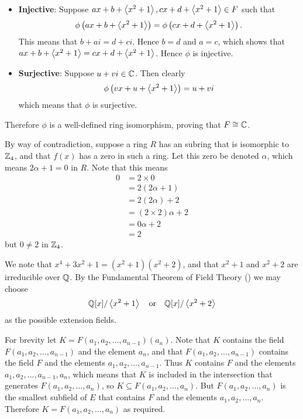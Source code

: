 \begin{questions}
\begin{itemize}
        \item \textbf{Injective}: Suppose $ax + b + \left\langle x^2+1\right\rangle, cx + d + \left\langle x^2+1\right\rangle \in F$ such that
        \[
            \phi\left(ax + b + \left\langle x^2+1\right\rangle\right) = \phi\left(cx + d + \left\langle x^2+1\right\rangle\right).
        \]
        This means that $b + ai = d + ci$. Hence $b = d$ and $a = c$, which shows that $ax + b + \left\langle x^2+1\right\rangle = cx + d + \left\langle x^2+1\right\rangle$. Hence $\phi$ is injective.

        \item \textbf{Surjective}: Suppose $u + vi \in \mathbb{C}$. Then clearly
        \[
            \phi\left(vx + u + \left\langle x^2+1\right\rangle\right) = u + vi
        \]
        which means that $\phi$ is surjective.
    \end{itemize}
    Therefore $\phi$ is a well-defined ring isomorphism, proving that $F \cong \mathbb{C}$.

    \item By way of contradiction, suppose a ring $R$ has an subring that is isomorphic to $\mathbb{Z}_4$, and that $f(x)$ has a zero in such a ring. Let this zero be denoted $\alpha$, which means $2\alpha + 1 = 0$ in $R$. Note that this means
    \begin{align*}
        0 &= 2\times0\\
        &= 2(2\alpha + 1)\\
        &= 2(2\alpha) + 2\\
        &= (2 \times 2)\alpha + 2\\
        &= 0\alpha + 2\\
        &= 2
    \end{align*}
    but $0 \neq 2$ in $\mathbb{Z}_4$.

    \item We note that $x^4 + 3x^2 + 1 = (x^2+1)(x^2+2)$, and that $x^2+1$ and $x^2 + 2$ are irreducible over $\mathbb{Q}$. By the Fundamental Theorem of Field Theory () we may choose
    \[
        \mathbb{Q}[x]/\left\langle x^2+1\right\rangle \quad\text{or}\quad \mathbb{Q}[x]/\left\langle x^2+2\right\rangle
    \]
    as the possible extension fields.

    \item For brevity let $K = F(a_1, a_2, \dots, a_{n-1})(a_n)$. Note that $K$ contains the field $F(a_1, a_2, \dots, a_{n-1})$ and the element $a_n$, and that $F(a_1, a_2, \dots, a_{n-1})$ contains the field $F$ and the elements $a_1, a_2, \dots, a_{n-1}$. Thus $K$ contains $F$ and the elements $a_1, a_2, \dots, a_{n-1}, a_n$, which means that $K$ is included in the intersection that generates $F(a_1, a_2, \dots, a_n)$, so $K \subseteq F(a_1, a_2, \dots, a_n)$. But $F(a_1, a_2, \dots, a_n)$ is the smallest subfield of $E$ that contains $F$ and the elements $a_1, a_2, \dots, a_n$. Therefore $K = F(a_1, a_2, \dots, a_n)$ as required.
    

\end{questions}
